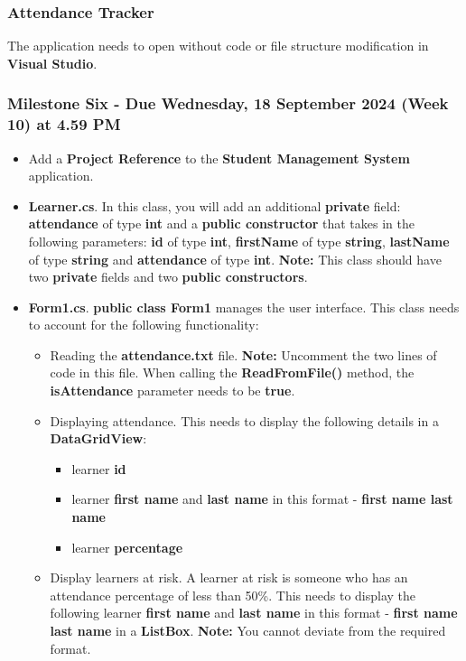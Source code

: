 \documentclass{article}
\begin{document}
\subsubsection*{Attendance Tracker}

The application needs to open without code or file structure modification in \textbf{Visual Studio}.

\subsubsection*{Milestone Six - Due Wednesday, 18 September 2024 (Week 10) at 4.59 PM}

\begin{itemize}
    \item Add a \textbf{Project Reference} to the \textbf{Student Management System} application.
    \item \textbf{Learner.cs}. In this class, you will add an additional \textbf{private} field: \textbf{attendance} of type \textbf{int} and a \textbf{public constructor} that takes in the following parameters: \textbf{id} of type \textbf{int}, \textbf{firstName} of type \textbf{string}, \textbf{lastName} of type \textbf{string} and \textbf{attendance} of type \textbf{int}. \textbf{Note:} This class should have two \textbf{private} fields and two \textbf{public constructors}.
    \item \textbf{Form1.cs}. \textbf{public class Form1} manages the user interface. This class needs to account for the following functionality:
    \begin{itemize}
        \item Reading the \textbf{attendance.txt} file. \textbf{Note:} Uncomment the two lines of code in this file. When calling the \textbf{ReadFromFile()} method, the \textbf{isAttendance} parameter needs to be \textbf{true}.  
        \item Displaying attendance. This needs to display the following details in a \textbf{DataGridView}:
        \begin{itemize}
            \item learner \textbf{id}
            \item learner \textbf{first name} and \textbf{last name} in this format - \textbf{first name last name}
            \item learner \textbf{percentage}
        \end{itemize}
        \item Display learners at risk. A learner at risk is someone who has an attendance percentage of less than 50\%. This needs to display the following learner \textbf{first name} and \textbf{last name} in this format - \textbf{first name last name} in a \textbf{ListBox}. \textbf{Note:} You cannot deviate from the required format.
    \end{itemize}
\end{itemize}
\end{document}
